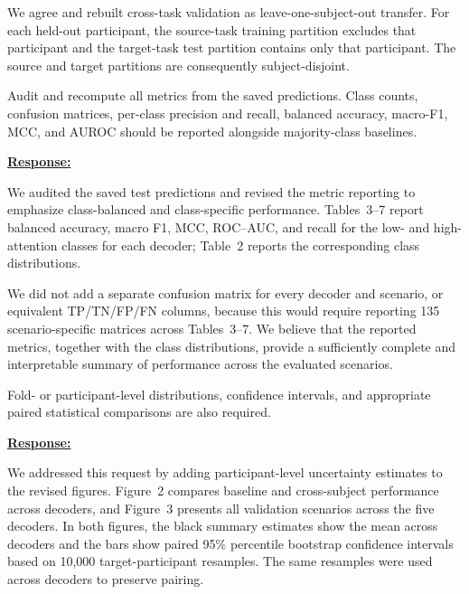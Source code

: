 \documentclass{article}
\begin{document}
We agree and rebuilt cross-task validation as leave-one-subject-out transfer.
For each held-out participant, the source-task training partition excludes that
participant and the target-task test partition contains only that participant.
The source and target partitions are consequently subject-disjoint.

\vspace{0.3cm}


\begin{cmt}{}{}

Audit and recompute all metrics from the saved predictions. Class counts,
confusion matrices, per-class precision and recall, balanced accuracy, macro-F1,
MCC, and AUROC should be reported alongside majority-class baselines.

\end{cmt}
\vspace{0.1cm}
\noindent
\underline{\textbf{Response:}}
\vspace{0.2cm}

We audited the saved test predictions and revised the metric reporting to
emphasize class-balanced and class-specific performance. Tables~3--7 report
balanced accuracy, macro F1, MCC, ROC--AUC, and recall for the low- and
high-attention classes for each decoder; Table~2 reports the corresponding class
distributions.

We did not add a separate confusion matrix for every decoder and scenario, or
equivalent TP/TN/FP/FN columns, because this would require reporting 135
scenario-specific matrices across Tables~3--7. We believe that the reported
metrics, together with the class distributions, provide a sufficiently complete
and interpretable summary of performance across the evaluated scenarios.

\vspace{0.3cm}


\begin{cmt}{}{}

Fold- or participant-level distributions, confidence intervals, and appropriate
paired statistical comparisons are also required.

\end{cmt}
\vspace{0.1cm}
\noindent
\underline{\textbf{Response:}}
\vspace{0.2cm}

We addressed this request by adding participant-level uncertainty estimates to
the revised figures. Figure~2 compares baseline and cross-subject performance
across decoders, and Figure~3 presents all validation scenarios across the five
decoders. In both figures, the black summary estimates show the mean across
decoders and the bars show paired 95\% percentile bootstrap confidence intervals
based on 10,000 target-participant resamples. The same resamples were used
across decoders to preserve pairing.
\end{document}
